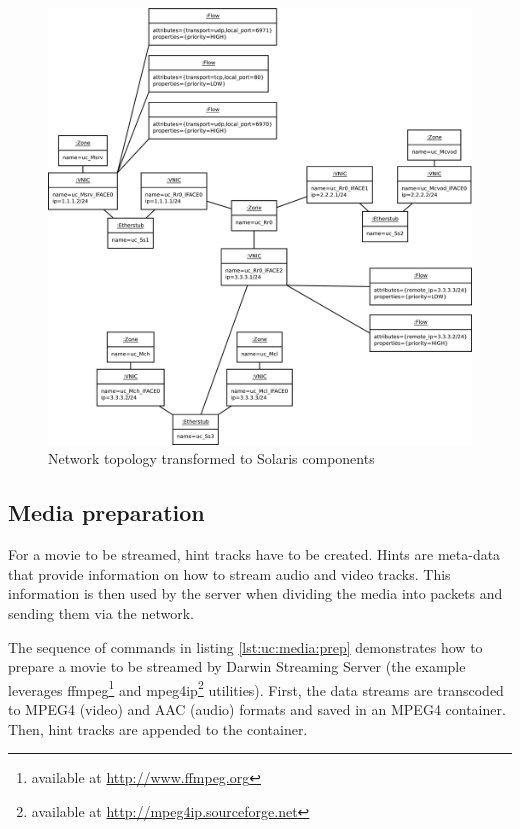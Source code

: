 \documentclass[11pt]{book}
\begin{document}
        \begin{figure}[H]
          \centering
          \includegraphics[width=.9\textwidth]{img/test-case/topology-xbow.pdf}

          \caption{Network topology transformed to Solaris components}
          \label{fig:cs:topo-xbow}
        \end{figure}


      \subsection{Media preparation}
      \label{sub:}

        For a movie to be streamed, hint tracks have to be created. Hints are meta-data that provide information on how
        to stream audio and video tracks. This information is then used by the server when dividing the media into
        packets and sending them via the network.

        The sequence of commands in listing \ref{lst:uc:media:prep} demonstrates how to prepare a movie to be streamed
        by Darwin Streaming Server (the example leverages ffmpeg\footnote{available at \url{http://www.ffmpeg.org}} and
        mpeg4ip\footnote{available at \url{http://mpeg4ip.sourceforge.net}} utilities). First, the data streams are
        transcoded to MPEG4 (video) and AAC (audio) formats and saved in an MPEG4 container. Then, hint tracks are
        appended to the container. \\
\end{document}
